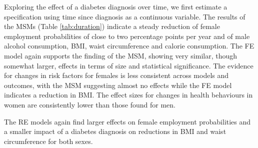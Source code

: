 Exploring the effect of a diabetes diagnosis over time, we first estimate a specification using time since diagnosis as a continuous variable. The results of the \acp{MSM} (Table \ref{tab:duration}) indicate a steady reduction of female employment probabilities of close to two percentage points per year and of male alcohol consumption, \ac{BMI}, waist circumference and calorie consumption. The \ac{FE} model again supports the finding of the \ac{MSM}, showing very similar, though somewhat larger, effects in terms of size and statistical significance. The evidence for changes in risk factors for females is less consistent across models and outcomes, with the \ac{MSM} suggesting almost no effects while the \ac{FE} model indicates a reduction in \ac{BMI}. The effect sizes for changes in health behaviours in women are consistently lower than those found for men. 

The \ac{RE} models again find larger effects on female employment probabilities and a smaller impact of a diabetes diagnosis on reductions in \ac{BMI} and waist circumference for both sexes. 


